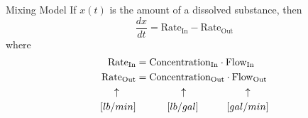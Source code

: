 \documentclass{beamer}
\newcommand{\thingin}[1]{\text{#1}_{\text{In}}}
\newcommand{\thingout}[1]{\text{#1}_{\text{Out}}}
\begin{document}
\begin{frame}
\begin{block}{Mixing Model}
If $x(t)$ is the amount of a dissolved substance, then
\begin{equation*}
\dfrac{dx}{dt} = \thingin{Rate} - \thingout{Rate}
\end{equation*}
where
\begin{equation*}
\begin{aligned}
\thingin{Rate} &= \thingin{Concentration} \cdot \thingin{Flow} \\
\thingout{Rate} &= \thingout{Concentration} \cdot \thingout{Flow} \\
\uparrow\hspace{6mm} & \hspace{15mm}\uparrow \hspace{21mm}\uparrow \\
[lb / min]\hspace{0mm} & \hspace{11mm}[lb / gal] \hspace{10mm}[gal / min] %
\end{aligned}
\end{equation*}
\end{block}
\end{frame}
\end{document}
